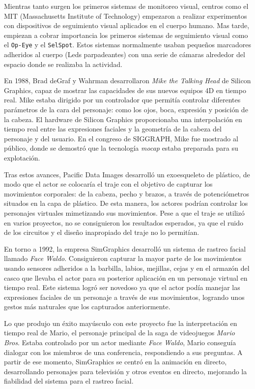 Mientras tanto surgen los primeros sistemas de monitoreo visual, centros como el MIT (Massachusetts Institute of Technology) empezaron a realizar experimentos con dispositivos de seguimiento visual aplicados en el cuerpo humano. Mas tarde, empiezan a cobrar importancia los primeros sistemas de seguimiento visual como el \texttt{Op-Eye} y el \texttt{SelSpot}. Estos sistemas normalmente usaban pequeños marcadores adheridos al cuerpo (Leds parpadeantes) con una serie de cámaras alrededor del espacio donde se realizaba la actividad.

En 1988, Brad deGraf y Wahrman desarrollaron \textit{Mike the Talking Head} de Silicon Graphics, capaz de mostrar las capacidades de sus nuevos equipos 4D en tiempo real. Mike estaba dirigido por un controlador que permitía controlar diferentes parámetros de la cara del personaje: como los ojos, boca, expresión y posición de la cabeza. El hardware de Silicon Graphics proporcionaba una interpolación en tiempo real entre las expresiones faciales y la geometría de la cabeza del personaje y del usuario. En el congreso de SIGGRAPH, Mike fue mostrado al público, donde se demostró que la tecnología \textit{mocap} estaba preparada para su explotación. 

Tras estos avances, Pacific Data Images desarrolló un exoesqueleto de plástico, de modo que el actor se colocaría el traje con el objetivo de capturar los movimientos corporales: de la cabeza, pecho y brazos, a través de potenciómetros situados en la capa de plástico. De esta manera, los actores podrían controlar los personajes virtuales mimetizando sus movimientos. Pese a que el traje se utilizó en varios proyectos, no se consiguieron los resultados esperados, ya que el ruido de los circuitos y el diseño inapropiado del traje no lo permitían. 

En torno a 1992, la empresa SimGraphics desarrolló un sistema de rastreo facial llamado \textit{Face Waldo}. Consiguieron capturar la mayor parte de los movimientos usando sensores adheridos a la barbilla, labios, mejillas, cejas y en el armazón del casco que llevaba el actor para su posterior aplicación en un personaje virtual en tiempo real. Este sistema logró ser novedoso ya que el actor podía manejar las expresiones faciales de un personaje a través de sus movimientos, logrando unos gestos más naturales que los capturados anteriormente.

Lo que produjo un éxito mayúsculo con este proyecto fue la interpretación en tiempo real de Mario, el personaje principal de la saga de videojuegos \textit{Mario Bros}. Estaba controlado por un actor mediante \textit{Face Waldo}, Mario conseguía dialogar con los miembros de una conferencia, respondiendo a sus preguntas. A partir de ese momento, SimGraphics se centró en la animación en directo, desarrollando personajes para televisión y otros eventos en directo, mejorando la fiabilidad del sistema para el rastreo facial. 

